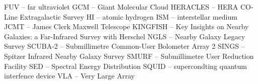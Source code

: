 FUV -- far ultraviolet
GCM -- Giant Molecular Cloud
HERACLES -- HERA CO-Line Extragalactic Survey
HI -- atomic hydrogen
ISM -- interstellar medium
JCMT -- James Clerk Maxwell Telescope
KINGFISH -- Key Insights on Nearby Galaxies: a Far-Infrared Survey with Herschel
NGLS -- Nearby Galaxy Legacy Survey
SCUBA-2 -- Submillimetre Common-User Bolometer Array 2
SINGS -- Spitzer Infrared Nearby Galaxy Survey
SMURF -- Submillimetre User Reduction Facility
SED -- Spectral Energy Distribution
SQUID -- supercondting quantum interfence device
VLA -- Very Large Array
